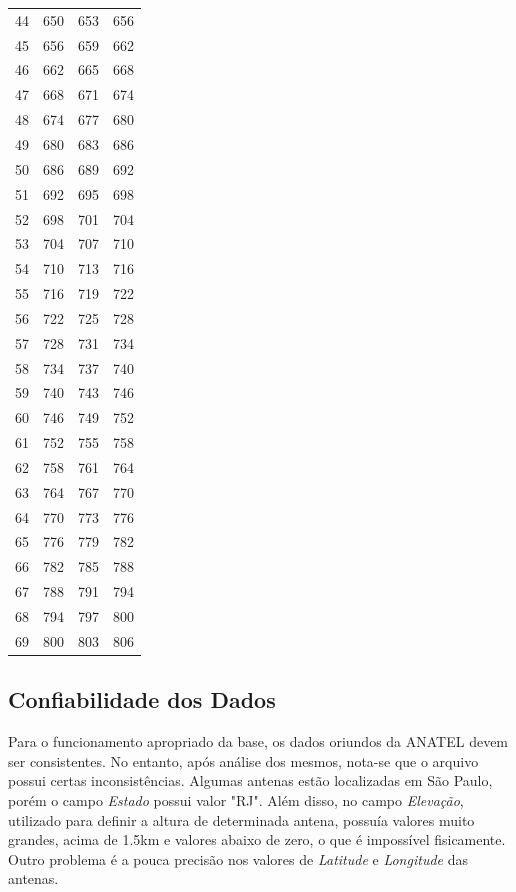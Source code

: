 \begin{center}
\begin{longtable}{cccc}
44 & 650 & 653 & 656 \\ 
45 & 656 & 659 & 662 \\ 
46 & 662 & 665 & 668 \\ 
47 & 668 & 671 & 674 \\ 
48 & 674 & 677 & 680 \\ 
49 & 680 & 683 & 686 \\ 
50 & 686 & 689 & 692 \\ 
51 & 692 & 695 & 698 \\ 
52 & 698 & 701 & 704 \\ 
53 & 704 & 707 & 710 \\ 
54 & 710 & 713 & 716 \\ 
55 & 716 & 719 & 722 \\ 
56 & 722 & 725 & 728 \\ 
57 & 728 & 731 & 734 \\ 
58 & 734 & 737 & 740 \\ 
59 & 740 & 743 & 746 \\ 
60 & 746 & 749 & 752 \\ 
61 & 752 & 755 & 758 \\ 
62 & 758 & 761 & 764 \\ 
63 & 764 & 767 & 770 \\ 
64 & 770 & 773 & 776 \\ 
65 & 776 & 779 & 782 \\ 
66 & 782 & 785 & 788 \\ 
67 & 788 & 791 & 794 \\ 
68 & 794 & 797 & 800 \\ 
69 & 800 & 803 & 806 \\ 

\end{longtable}
\end{center}


\subsection{Confiabilidade dos Dados}

Para o funcionamento apropriado da base, os dados oriundos da ANATEL devem ser consistentes. No entanto, após análise dos mesmos, nota-se que o arquivo possui certas inconsistências. Algumas antenas estão localizadas em São Paulo, porém o campo \textit{Estado} possui valor "RJ". Além disso, no campo \textit{Elevação}, utilizado para definir a altura de determinada antena, possuía valores muito grandes, acima de 1.5km e valores abaixo de zero, o que é impossível fisicamente.
Outro problema é a pouca precisão nos valores de \textit{Latitude} e \textit{Longitude} das antenas.

